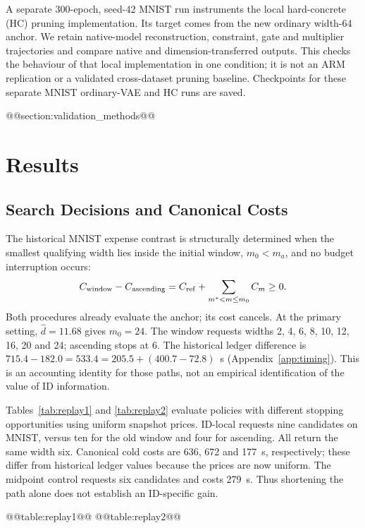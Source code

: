 A separate 300-epoch, seed-42 MNIST run instruments the local
hard-concrete (HC) pruning implementation. Its target comes from the
new ordinary width-64 anchor. We retain native-model reconstruction,
constraint, gate and multiplier trajectories and compare native and
dimension-transferred outputs. This checks the behaviour of that local
implementation in one condition; it is not an ARM replication or a
validated cross-dataset pruning baseline. Checkpoints for these separate
MNIST ordinary-VAE and HC runs are saved.

@@section:validation_methods@@

\section{Results}\label{sec:results}

\subsection{Search Decisions and Canonical Costs}\label{sec:replayresults}
The historical MNIST expense contrast is structurally determined when
the smallest qualifying width lies inside the initial window,
$m_0<m_a$, and no budget interruption occurs:
\begin{equation}
 C_{\rm window}-C_{\rm ascending}
 =C_{\rm ref}+\sum_{m^*<m\le m_0}C_m\ge0.
 \label{eq:dominance}
\end{equation}
Both procedures already evaluate the anchor; its cost cancels.
At the primary setting, $\hat d=11.68$ gives $m_0=24$.
The window requests widths 2, 4, 6, 8, 10, 12, 16, 20 and 24;
ascending stops at 6. The historical ledger difference is
$715.4-182.0=533.4=205.5+(400.7-72.8)$~s
(Appendix~\ref{app:timing}). This is an accounting identity for those
paths, not an empirical identification of the value of ID information.

Tables~\ref{tab:replay1} and \ref{tab:replay2} evaluate policies with
different stopping opportunities using uniform snapshot prices.
ID-local requests nine candidates on MNIST, versus ten for the old
window and four for ascending. All return the same width six.
Canonical cold costs are 636, 672 and 177~s, respectively; these differ
from historical ledger values because the prices are now uniform.
The midpoint control requests six candidates and costs 279~s.
Thus shortening the path alone does not establish an ID-specific gain.

@@table:replay1@@
@@table:replay2@@

